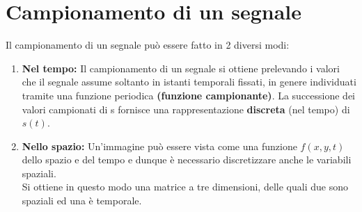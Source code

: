\section{Campionamento di un segnale}
Il campionamento di un segnale può essere fatto in 2 diversi modi:
\begin{enumerate}
    \item \textbf{Nel tempo:} Il campionamento di un segnale si ottiene
          prelevando i valori che il segnale assume soltanto in istanti
          temporali fissati, in genere individuati tramite una funzione
          periodica \textbf{(funzione campionante)}. La successione dei valori
          campionati di s fornisce una rappresentazione \textbf{discreta} (nel
          tempo) di $s(t)$.
    \item \textbf{Nello spazio:} Un’immagine può essere vista come una funzione
          $f(x,y,t)$ dello spazio e del tempo e dunque è necessario
          discretizzare anche le variabili spaziali. \\Si ottiene in questo modo
          una matrice a tre dimensioni, delle quali due sono spaziali ed una è
          temporale.
\end{enumerate}
